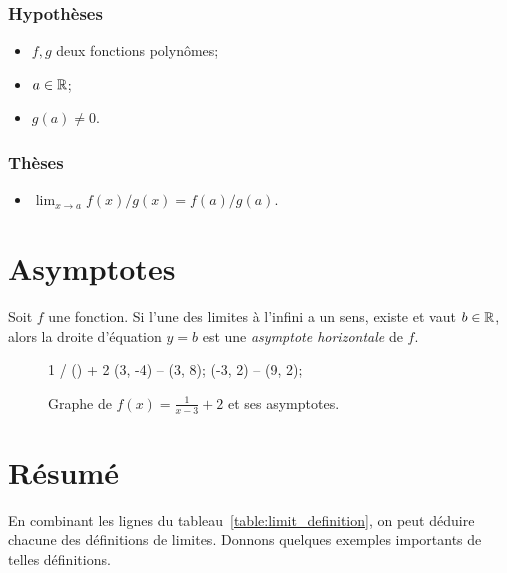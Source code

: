 \documentclass[main.tex]{subfiles}
\begin{document}
\begin{proposition}
    \subsubsection*{Hypothèses}
    \begin{itemize}
        \item $f, g$ deux fonctions polynômes;
        \item $a \in \mathbb{R}$;
        \item $g(a) \ne 0$.
    \end{itemize}

    \subsubsection*{Thèses}
    \begin{itemize}
        \item $\lim_{x \to a} f(x)/g(x) = f(a)/g(a)$.
    \end{itemize}
\end{proposition}

\section{Asymptotes}

\begin{definition}

    Soit $f$ une fonction.
    Si l'une des limites à l'infini a un sens, existe et vaut $b \in \mathbb{R}$,
    alors la droite d'équation $y = b$ est
    une \emph{asymptote horizontale} de $f$.
\end{definition}

\begin{figure}
    \centering
    \begin{plot}{0.5}{-3}{-4}{9}{8}
         {1 / () + 2}
        \drawline (3, -4) -- (3, 8);
        \drawline (-3, 2) -- (9, 2);
    \end{plot}
    \caption{Graphe de $f(x) = \frac 1 {x - 3} + 2$ et ses asymptotes.}
\end{figure}

\section{Résumé}

En combinant les lignes du tableau~\ref{table:limit_definition},
on peut déduire chacune des définitions de limites.
Donnons quelques exemples importants de telles définitions.
\end{document}
